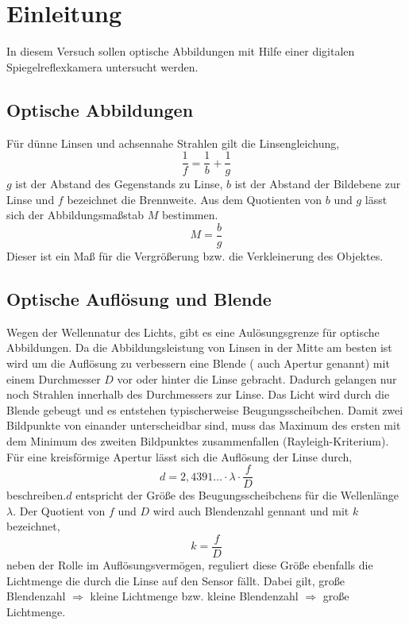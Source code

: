\section{Einleitung}
In diesem Versuch sollen optische Abbildungen mit Hilfe einer digitalen Spiegelreflexkamera untersucht werden.
\subsection{Optische Abbildungen}
Für dünne Linsen und achsennahe Strahlen gilt die Linsengleichung,
\begin{equation}
\frac{1}{f}=\frac{1}{b}+\frac{1}{g}
\end{equation}
$ \textit{g} $ ist der Abstand des Gegenstands zu Linse, $ \textit{b} $ ist der Abstand der Bildebene zur Linse und $ \textit{f} $ bezeichnet die Brennweite.
Aus dem Quotienten von $ \textit{b} $ und $ \textit{g} $ lässt sich der Abbildungsmaßstab $ \textit{M} $ bestimmen.
\begin{equation}
M=\frac{b}{g}
\end{equation}
Dieser ist ein Maß für die Vergrößerung bzw. die Verkleinerung des Objektes.
\subsection{Optische Auflösung und Blende}
Wegen der Wellennatur des Lichts, gibt es eine Aulösungsgrenze für optische Abbildungen. Da die Abbildungsleistung von Linsen in der Mitte am besten ist wird um die Auflösung zu verbessern eine Blende ( auch Apertur genannt) mit einem Durchmesser $ \textit{D} $ vor oder hinter die Linse gebracht. Dadurch gelangen nur noch Strahlen innerhalb des Durchmessers zur Linse. Das Licht wird durch die Blende gebeugt und es entstehen typischerweise Beugungsscheibchen. Damit zwei Bildpunkte von einander unterscheidbar sind, muss das Maximum des ersten mit dem Minimum des zweiten Bildpunktes zusammenfallen (Rayleigh-Kriterium).
Für eine kreisförmige Apertur lässt sich die Auflösung der Linse durch,
\begin{equation}
d=2,4391\ldots\cdot\lambda\cdot\frac{f}{D}
\end{equation}
beschreiben.$ \textit{d} $ entspricht der Größe des Beugungsscheibchens für die Wellenlänge $ \lambda $.
Der Quotient von $ \textit{f} $ und $ \textit{D} $ wird auch Blendenzahl gennant und mit $ \textit{k} $ bezeichnet,
\begin{equation}
k=\frac{f}{D}
\end{equation}
neben der Rolle im Auflösungsvermögen, reguliert diese Größe ebenfalls die Lichtmenge die durch die Linse auf den Sensor fällt.
Dabei gilt, große Blendenzahl $ \Rightarrow $ kleine Lichtmenge bzw.
kleine Blendenzahl $ \Rightarrow $ große Lichtmenge.
